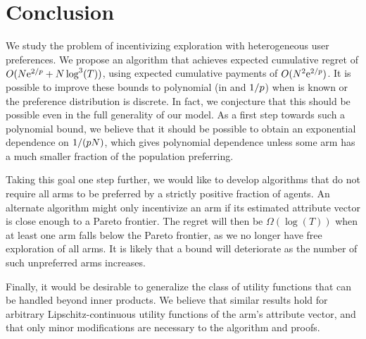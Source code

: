 \section{Conclusion}
We study the problem of incentivizing exploration with heterogeneous
user preferences.
We propose an algorithm that achieves expected cumulative regret of
$O(N \mathrm{e}^{2/p} + N \log^3(T))$,
using expected cumulative payments of $O(N^2 \mathrm{e}^{2/p})$.
It is possible to improve these bounds to polynomial (in \ARMNUM and
$1/p$) when \MinProb is known or the preference distribution is
discrete.
In fact, we conjecture that this should be possible even in the full
generality of our model.
As a first step towards such a polynomial bound, we believe that it
should be possible to obtain an exponential dependence on
$1/(p N)$, which gives polynomial dependence unless some
arm has a much smaller fraction of the population preferring.

Taking this goal one step further, we would like to 
develop algorithms that do not require all arms to be preferred by a
strictly positive fraction of agents.
An alternate algorithm might only incentivize an arm if its estimated
attribute vector is close enough to a Pareto frontier.
The regret will then be $\Omega(\log(T))$ when at least one arm falls
below the Pareto frontier, as we no longer have free exploration of
all arms. 
It is likely that a bound will deteriorate as the number of such
unpreferred arms increases.

Finally, it would be desirable to generalize the class of utility
functions that can be handled beyond inner products.
We believe that similar results hold for arbitrary
Lipschitz-continuous utility functions of the arm's attribute vector,
and that only minor modifications are necessary to the algorithm and
proofs.
